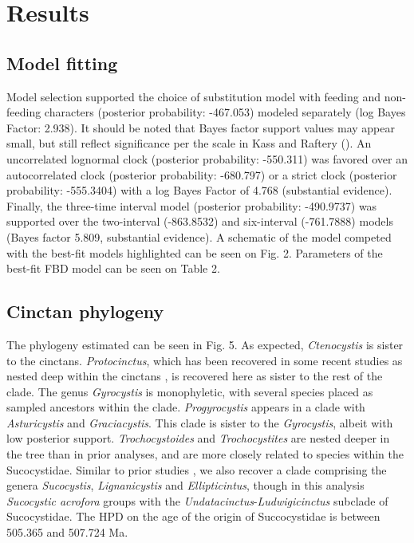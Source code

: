 \documentclass{article}
\begin{document}
\section{Results}

\subsection{Model fitting}

Model selection supported the choice of substitution model with feeding and non-feeding characters (posterior probability: -467.053) modeled separately (log Bayes Factor: 2.938).
It should be noted that Bayes factor support values may appear small, but still reflect significance per the scale in Kass and Raftery (\citeyear{Kass1995}).
An uncorrelated lognormal clock (posterior probability: -550.311) was favored over an autocorrelated clock (posterior probability: -680.797) or a strict clock (posterior probability: -555.3404) with a log Bayes Factor of 4.768 (substantial evidence).
Finally, the three-time interval model (posterior probability: -490.9737) was supported over the two-interval (-863.8532) and six-interval (-761.7888) models (Bayes factor 5.809, substantial evidence). 
A schematic of the model competed with the best-fit models highlighted can be seen on Fig. 2.
Parameters of the best-fit FBD model can be seen on Table 2.

\subsection{Cinctan phylogeny}

The phylogeny estimated can be seen in Fig. 5.
As expected, \textit{Ctenocystis} is sister to the cinctans. 
\textit{Protocinctus}, which has been recovered in some recent studies as nested deep within the cinctans \citep{SmithZamora2009}, is recovered here as sister to the rest of the clade. 
The genus \textit{Gyrocystis} is monophyletic, with several species placed as sampled ancestors within the clade. 
 \textit{Progyrocystis} appears in a clade with \textit{Asturicystis} and \textit{Graciacystis}. 
This clade is sister to the \textit{Gyrocystis}, albeit with low posterior support. 
\textit{Trochocystoides} and \textit{Trochocystites} are nested deeper in the tree than in prior analyses, and are more closely related to species within the Sucocystidae.
Similar to prior studies \citep{SmithZamora2009,ZamoraRahmanSmith2013}, we also recover a clade comprising the genera \textit{Sucocystis}, \textit{Lignanicystis} and \textit{Ellipticintus}, though in this analysis \textit{Sucocystic acrofora} groups with the \textit{Undatacinctus}-\textit{Ludwigicinctus} subclade of Sucocystidae.
The HPD on the age of the origin of Succocystidae is between 505.365 and 507.724 Ma.
\end{document}
